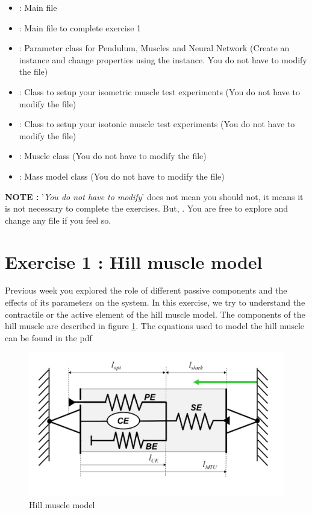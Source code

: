 \documentclass{cmc}
\begin{document}
\begin{itemize}
\item {} : Main file
\item {} : Main file to complete exercise 1
\item {} : Parameter class for Pendulum,
  Muscles and Neural Network (Create an instance and change properties
  using the instance. You do not have to modify the file)
\item {} : Class to setup your isometric
  muscle test experiments (You do not have to modify the file)
\item {} : Class to setup your isotonic
  muscle test experiments (You do not have to modify the file)
\item {} : Muscle class (You do not have to modify
  the file)
\item {} : Mass model class (You do not have to modify
  the file)
\end{itemize}

\textbf{NOTE : } '\textit{You do not have to modify}' does not mean
you should not, it means it is not necessary to complete the
exercises. But, . You are free to explore
and change any file if you feel so.


\section*{Exercise 1 : Hill muscle model}
\label{sec:question-2}

Previous week you explored the role of different passive components
and the effects of its parameters on the system. In this exercise, we
try to understand the contractile or the active element of the hill
muscle model. The components of the hill muscle are described in
figure \ref{fig:hill_muscle}. The equations used to model the hill
muscle can be found in the pdf 

\begin{figure}[H]
  \centering \includegraphics[scale=.5]{figures/hill_muscle}
  \caption{Hill muscle model}
  \label{fig:hill_muscle}
\end{figure}
\end{document}
